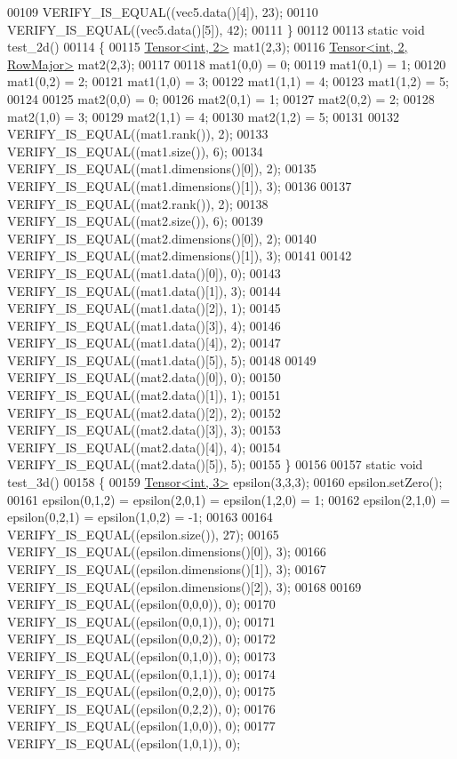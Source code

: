 \begin{DoxyCode}
00109   VERIFY\_IS\_EQUAL((vec5.data()[4]), 23);
00110   VERIFY\_IS\_EQUAL((vec5.data()[5]), 42);
00111 \}
00112 
00113 \textcolor{keyword}{static} \textcolor{keywordtype}{void} test\_2d()
00114 \{
00115   \hyperlink{class_eigen_1_1_tensor}{Tensor<int, 2>} mat1(2,3);
00116   \hyperlink{class_eigen_1_1_tensor}{Tensor<int, 2, RowMajor>} mat2(2,3);
00117 
00118   mat1(0,0) = 0;
00119   mat1(0,1) = 1;
00120   mat1(0,2) = 2;
00121   mat1(1,0) = 3;
00122   mat1(1,1) = 4;
00123   mat1(1,2) = 5;
00124 
00125   mat2(0,0) = 0;
00126   mat2(0,1) = 1;
00127   mat2(0,2) = 2;
00128   mat2(1,0) = 3;
00129   mat2(1,1) = 4;
00130   mat2(1,2) = 5;
00131 
00132   VERIFY\_IS\_EQUAL((mat1.rank()), 2);
00133   VERIFY\_IS\_EQUAL((mat1.size()), 6);
00134   VERIFY\_IS\_EQUAL((mat1.dimensions()[0]), 2);
00135   VERIFY\_IS\_EQUAL((mat1.dimensions()[1]), 3);
00136 
00137   VERIFY\_IS\_EQUAL((mat2.rank()), 2);
00138   VERIFY\_IS\_EQUAL((mat2.size()), 6);
00139   VERIFY\_IS\_EQUAL((mat2.dimensions()[0]), 2);
00140   VERIFY\_IS\_EQUAL((mat2.dimensions()[1]), 3);
00141 
00142   VERIFY\_IS\_EQUAL((mat1.data()[0]), 0);
00143   VERIFY\_IS\_EQUAL((mat1.data()[1]), 3);
00144   VERIFY\_IS\_EQUAL((mat1.data()[2]), 1);
00145   VERIFY\_IS\_EQUAL((mat1.data()[3]), 4);
00146   VERIFY\_IS\_EQUAL((mat1.data()[4]), 2);
00147   VERIFY\_IS\_EQUAL((mat1.data()[5]), 5);
00148 
00149   VERIFY\_IS\_EQUAL((mat2.data()[0]), 0);
00150   VERIFY\_IS\_EQUAL((mat2.data()[1]), 1);
00151   VERIFY\_IS\_EQUAL((mat2.data()[2]), 2);
00152   VERIFY\_IS\_EQUAL((mat2.data()[3]), 3);
00153   VERIFY\_IS\_EQUAL((mat2.data()[4]), 4);
00154   VERIFY\_IS\_EQUAL((mat2.data()[5]), 5);
00155 \}
00156 
00157 \textcolor{keyword}{static} \textcolor{keywordtype}{void} test\_3d()
00158 \{
00159   \hyperlink{class_eigen_1_1_tensor}{Tensor<int, 3>} epsilon(3,3,3);
00160   epsilon.setZero();
00161   epsilon(0,1,2) = epsilon(2,0,1) = epsilon(1,2,0) = 1;
00162   epsilon(2,1,0) = epsilon(0,2,1) = epsilon(1,0,2) = -1;
00163 
00164   VERIFY\_IS\_EQUAL((epsilon.size()), 27);
00165   VERIFY\_IS\_EQUAL((epsilon.dimensions()[0]), 3);
00166   VERIFY\_IS\_EQUAL((epsilon.dimensions()[1]), 3);
00167   VERIFY\_IS\_EQUAL((epsilon.dimensions()[2]), 3);
00168 
00169   VERIFY\_IS\_EQUAL((epsilon(0,0,0)), 0);
00170   VERIFY\_IS\_EQUAL((epsilon(0,0,1)), 0);
00171   VERIFY\_IS\_EQUAL((epsilon(0,0,2)), 0);
00172   VERIFY\_IS\_EQUAL((epsilon(0,1,0)), 0);
00173   VERIFY\_IS\_EQUAL((epsilon(0,1,1)), 0);
00174   VERIFY\_IS\_EQUAL((epsilon(0,2,0)), 0);
00175   VERIFY\_IS\_EQUAL((epsilon(0,2,2)), 0);
00176   VERIFY\_IS\_EQUAL((epsilon(1,0,0)), 0);
00177   VERIFY\_IS\_EQUAL((epsilon(1,0,1)), 0);

\end{DoxyCode}
